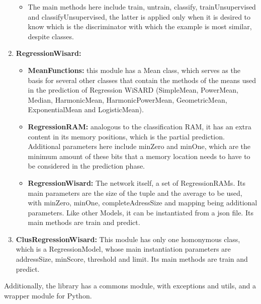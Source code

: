 \documentclass[12pt]{article}
\begin{document}
\begin{enumerate}
\begin{itemize}
        \item The main methods here include train, untrain, classify, trainUnsupervised and classifyUnsupervised, the latter is applied only when it is desired to know which is the discriminator with which the example is most similar, despite classes. 
    \end{itemize}
    \item \textbf{RegressionWisard:}
    \begin{itemize}
        \item \textbf{MeanFunctions:} this module has a Mean class, which serves as the basis for several other classes that contain the methods of the means used in the prediction of Regression WiSARD (SimpleMean, PowerMean, Median, HarmonicMean, HarmonicPowerMean, GeometricMean, ExponentialMean and LogisticMean).
        \item \textbf{RegressionRAM:} analogous to the classification RAM, it has an extra content in its memory positions, which is the partial prediction. Additional parameters here include minZero and minOne, which are the minimum amount of these bits that a memory location needs to have to be considered in the prediction phase.
        \item \textbf{RegressionWisard:} The network itself, a set of RegressionRAMs. Its main parameters are the size of the tuple and the average to be used, with minZero, minOne, completeAdressSize and mapping being additional parameters. Like other Models, it can be instantiated from a json file. Its main methods are train and predict.
    \end{itemize}
    \item \textbf{ClusRegressionWisard:} This module has only one homonymous class, which is a RegressionModel, whose main instantiation parameters are addressSize, minScore, threshold and limit. Its main methods are train and predict.
\end{enumerate}

Additionally, the library has a commons module, with exceptions and utils, and a wrapper module for Python.

%
%
\end{document}

